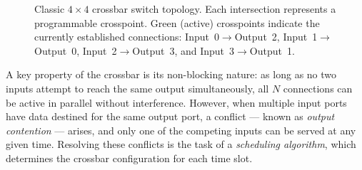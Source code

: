 \begin{figure}[htbp]
    \centering
    \caption{Classic $4 \times 4$ crossbar switch topology. Each intersection represents a 
    programmable crosspoint. Green (active) crosspoints indicate the currently established 
    connections: Input~0$\to$Output~2, Input~1$\to$Output~0, Input~2$\to$Output~3, 
    and Input~3$\to$Output~1.}
    \label{fig:classic_crossbar}
\end{figure}

A key property of the crossbar is its non-blocking nature: as long as no two inputs attempt to 
reach the same output simultaneously, all $N$ connections can be active in parallel without 
interference. However, when multiple input ports have data destined for the same output port, 
a conflict --- known as \emph{output contention} --- arises, and only one of the competing inputs 
can be served at any given time. Resolving these conflicts is the task of a 
\emph{scheduling algorithm}, which determines the crossbar configuration for each time slot.

